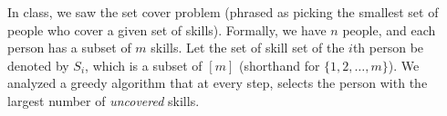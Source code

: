 \documentclass[addpoints, 11pt]{exam}
\begin{document}
\begin{questions}
  In class, we saw the set cover problem (phrased as picking the smallest set of people who cover a given set of skills). Formally, we have $n$ people, and each person has a subset of $m$ skills. Let the set of skill set of the $i$th person be denoted by $S_i$, which is a subset of $[m]$ (shorthand for $\{1, 2, \dots, m\}$). We analyzed a greedy algorithm that at every step, selects the person with the largest number of {\em uncovered} skills.
\end{questions}
\end{document}
